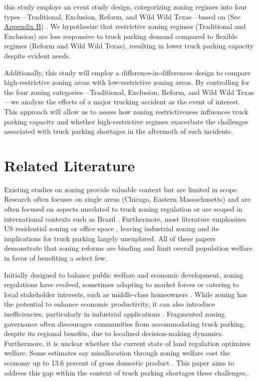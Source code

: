 \documentclass[
  12pt]{article}
\begin{document}
this study employs an event study design, categorizing zoning regimes
into four types---Traditional, Exclusion, Reform, and Wild Wild
Texas---based on \citep{puentesTraditionalReformedReview2006} (See
\protect\hypertarget{sec:appendix-b}{\protect\hyperlink{sec-b.-map-of-zoning-categories}{Appendi}}\protect\hyperlink{sec:appendix-b}{x
B}) . We hypothesize that restrictive zoning regimes (Traditional and
Exclusion) are less responsive to truck parking demand compared to
flexible regimes (Reform and Wild Wild Texas), resulting in lower truck
parking capacity despite evident needs.

Additionally, this study will employ a difference-in-differences design
to compare high-restrictive zoning areas with low-restrictive zoning
areas. By controlling for the four zoning categories---Traditional,
Exclusion, Reform, and Wild Wild Texas---we analyze the effects of a
major trucking accident as the event of interest. This approach will
allow us to assess how zoning restrictiveness influences truck parking
capacity and whether high-restrictive regimes exacerbate the challenges
associated with truck parking shortages in the aftermath of such
incidents.

\hypertarget{related-literature}{%
\section{Related Literature}\label{related-literature}}

Existing studies on zoning provide valuable context but are limited in
scope. Research often focuses on single areas (Chicago, Eastern
Massachusetts) and are often focused on aspects unrelated to truck
zoning regulation
\citep{shertzerRaceEthnicityDiscriminatory2016, glaeserCausesConsequencesLand2009}
or are scoped in international contexts such as Brazil
\citep{anagolEstimatingEconomicValue2021}. Furthermore, most literature
emphasizes US residential zoning
\citep{lensStrictLandUse2016, huangResidentialLandUse2012}or office
space \citep{cheshireOfficeSpaceSupply2008}, leaving industrial zoning
and its implications for truck parking largely unexplored. All of these
papers demonstrate that zoning reforms are binding and limit overall
population welfare in favor of benefiting a select few.

Initially designed to balance public welfare and economic development,
zoning regulations have evolved, sometimes adapting to market forces or
catering to local stakeholder interests, such as middle-class homeowners
\citep{fischelEconomicHistoryZoning2024}. While zoning has the potential
to enhance economic productivity, it can also introduce inefficiencies,
particularly in industrial applications
\citep{mcdonaldPDFEconomicsZoning2012}. Fragmented zoning governance
often discourages communities from accommodating truck parking, despite
its regional benefits, due to localized decision-making dynamics.
Furthermore, it is unclear whether the current state of land regulation
optimizes welfare. Some estimates say misallocation through zoning
welfare cost the economy up to 13.6 percent of gross domestic product
\citep{osmanRestrictiveLandUse2020}. This paper aims to address this gap
within the context of truck parking shortages these challenges,.
\end{document}

